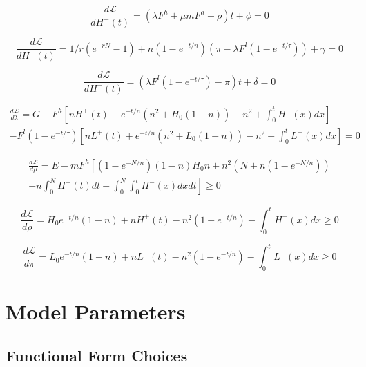 \documentclass[singlespace]{easychithesis}
\newcommand{\Lagr}{\mathcal{L}}
\begin{document}
\begin{equation}\label{eq:dLdH-}
\frac{d\Lagr}{dH^-(t)} = (\lambda F^h +\mu m F^h - \rho)t + \phi = 0
\end{equation}

\begin{equation}\label{eq:dLdL+}
\frac{d\Lagr}{dH^+(t)} = 1/r(e^{-rN} -1) + n(1-e^{-t/n})(\pi - \lambda F^l(1-e^{-t/\tau})) + \gamma = 0
\end{equation}

\begin{equation}\label{eq:dLdL-}
\frac{d\Lagr}{dH^-(t)} = (\lambda F^l(1-e^{-t/\tau}) - \pi)t + \delta = 0
\end{equation}

\begin{multline}\label{eq:dLdlambda}
\frac{d\Lagr}{d\lambda} = G - F^h\left[nH^+(t) + e^{-t/n}(n^2 + H_0(1-n)) - n^2 + \int_0^tH^-(x)dx\right] \\ - F^l (1-e^{-t/\tau})\left[nL^+(t) + e^{-t/n}(n^2 + L_0(1-n)) - n^2 + \int_0^tL^-(x)dx\right] = 0
\end{multline}

\begin{multline}\label{eq:dLdmu}
\frac{d\Lagr}{d\mu} = \bar{E} - mF^h \left [(1-e^{-N/n})(1-n)H_0 n + n^2(N + n(1-e^{-N/n})) \right.\\ + \left. n\int_0^N H^+(t) dt - \int_0^N\int_0^t H^-(x)dx dt   \right] \geq 0
\end{multline}

\begin{equation}\label{eq:dLdrho}
\frac{d\Lagr}{d\rho} = H_0 e^{-t/n}(1-n) + nH^+(t) - n^2(1-e^{-t/n}) - \int_0^t H^-(x)dx \geq 0 
\end{equation}

\begin{equation}\label{eq:dLdpi}
\frac{d\Lagr}{d\pi} = L_0 e^{-t/n}(1-n) + nL^+(t) - n^2(1-e^{-t/n}) - \int_0^t L^-(x)dx \geq 0 
\end{equation}






\section{Model Parameters}
\subsection{Functional Form Choices}
\end{document}
